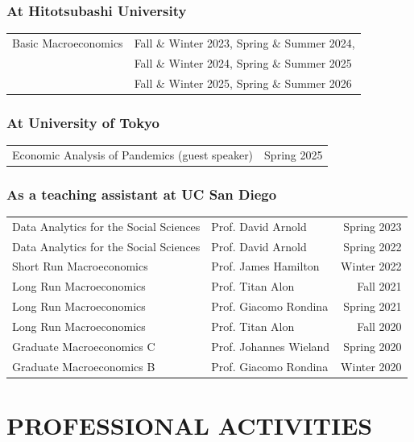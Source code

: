 \documentclass[12pt]{article}
\begin{document}
\subsubsection*{At Hitotsubashi University}
\begin{tabularx}{\linewidth}{@{}l Z@{}}
Basic Macroeconomics&Fall \& Winter 2023, Spring \& Summer 2024, \\
                    &Fall \& Winter 2024, Spring \& Summer 2025\\
                    &Fall \& Winter 2025, Spring \& Summer 2026\\
\end{tabularx}

\subsubsection*{At University of Tokyo}
\begin{tabularx}{\linewidth}{@{}l Z@{}}
Economic Analysis of Pandemics (guest speaker)&Spring 2025
\end{tabularx}

\subsubsection*{As a teaching assistant at UC San Diego}
\begin{tabularx}{\linewidth}{@{}l Y R@{}}
Data Analytics for the Social Sciences&Prof. David Arnold&Spring 2023\\
Data Analytics for the Social Sciences&Prof. David Arnold&Spring 2022\\
Short Run Macroeconomics&Prof. James Hamilton&Winter 2022\\
Long Run Macroeconomics&Prof. Titan Alon&Fall 2021\\
Long Run Macroeconomics&Prof. Giacomo Rondina&Spring 2021\\
Long Run Macroeconomics&Prof. Titan Alon&Fall 2020\\
Graduate Macroeconomics C&Prof. Johannes Wieland&Spring 2020\\
Graduate Macroeconomics B&Prof. Giacomo Rondina&Winter 2020
\end{tabularx}

\section*{PROFESSIONAL ACTIVITIES}
\end{document}
